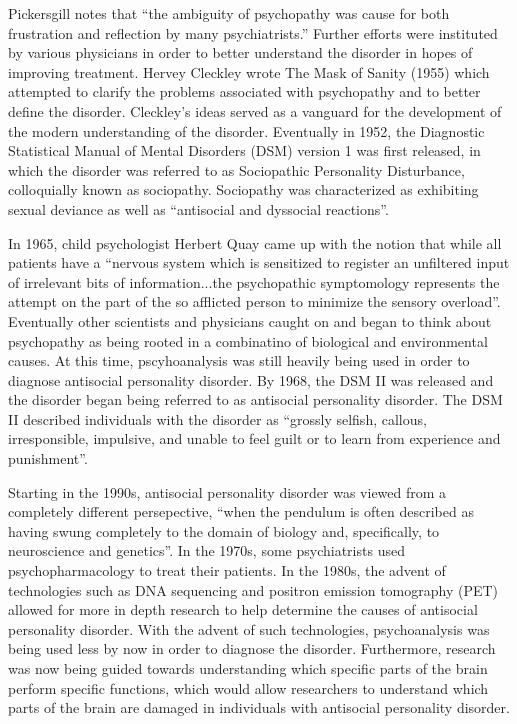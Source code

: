 Pickersgill notes that “the ambiguity of psychopathy was cause for both frustration and reflection by many psychiatrists.” \cite{pickersgill} Further efforts were instituted by various physicians in order to better understand the disorder in hopes of improving treatment. Hervey Cleckley wrote The Mask of Sanity (1955) which attempted to clarify the problems associated with psychopathy and to better define the disorder. Cleckley's ideas served as a vanguard for the development of the modern understanding of the disorder. Eventually in 1952, the Diagnostic Statistical Manual of Mental Disorders (DSM) version 1 was first released, in which the disorder was referred to as Sociopathic Personality Disturbance, colloquially known as sociopathy. Sociopathy was characterized as exhibiting sexual deviance as well as “antisocial and dyssocial reactions”. \cite{pickersgill}

In 1965, child psychologist Herbert Quay came up with the notion that while all patients have a “nervous system which is sensitized to register an unfiltered input of irrelevant bits of information...the psychopathic symptomology represents the attempt on the part of the so afflicted person to minimize the sensory overload”. \cite{pickersgill} Eventually other scientists and physicians caught on and began to think about psychopathy as being rooted in a combinatino of biological and environmental causes. At this time, pscyhoanalysis was still heavily being used in order to diagnose antisocial personality disorder. By 1968, the DSM II was released and the disorder began being referred to as antisocial personality disorder. The DSM II described individuals with the disorder as “grossly selfish, callous, irresponsible, impulsive, and unable to feel guilt or to learn from experience and punishment”. \cite{pickersgill}
	
Starting in the 1990s, antisocial personality disorder was viewed from a completely different persepective, “when the pendulum is often described as having swung completely to the domain of biology and, specifically, to neuroscience and genetics”. \cite{pickersgill}In the 1970s, some psychiatrists used psychopharmacology to treat their patients. \cite{Michale2000inPickersgill} In the 1980s, the advent of technologies such as DNA sequencing and positron emission tomography (PET) allowed for more in depth research to help determine the causes of antisocial personality disorder.  With the advent of such technologies, psychoanalysis was being used less by now in order to diagnose the disorder. Furthermore, research was now being guided towards understanding which specific parts of the brain perform specific functions, which would allow researchers to understand which parts of the brain are damaged in individuals with antisocial personality disorder. 
	
